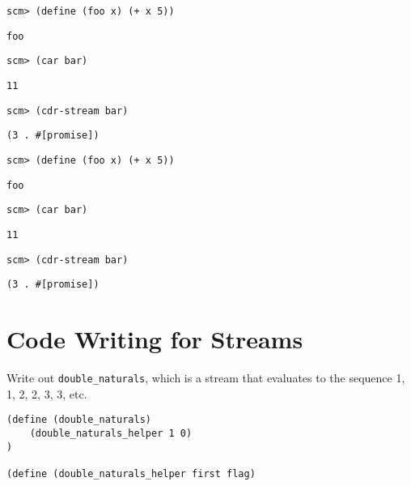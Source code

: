 \documentclass{exam}
\begin{document}
\begin{questions}
\begin{blocksection}
\begin{lstlisting}
scm> (define (foo x) (+ x 5))
\end{lstlisting}
\begin{solution}[.25in]
\texttt{foo}
\end{solution}

\begin{lstlisting}
scm> (car bar)
\end{lstlisting}
\begin{solution}[.25in]
\texttt{11}
\end{solution}

\begin{lstlisting}
scm> (cdr-stream bar)
\end{lstlisting}
\begin{solution}[.25in]
\texttt{(3 . #[promise])}
\end{solution}

\begin{lstlisting}
scm> (define (foo x) (+ x 5))
\end{lstlisting}
\begin{solution}[.25in]
\texttt{foo}
\end{solution}

\begin{lstlisting}
scm> (car bar)
\end{lstlisting}
\begin{solution}[.25in]
\texttt{11}
\end{solution}

\begin{lstlisting}
scm> (cdr-stream bar)
\end{lstlisting}
\begin{solution}[.25in]
\texttt{(3 . #[promise])}
\end{solution}
\end{blocksection}

\section{Code Writing for Streams}

\begin{blocksection}
\question Write out \texttt{double_naturals}, which is a stream that evaluates to the sequence 1, 1, 2, 2, 3, 3, etc.
\begin{lstlisting}
(define (double_naturals)
    (double_naturals_helper 1 0)
)

(define (double_naturals_helper first flag)





\end{lstlisting}
\end{blocksection}
\end{questions}
\end{document}
